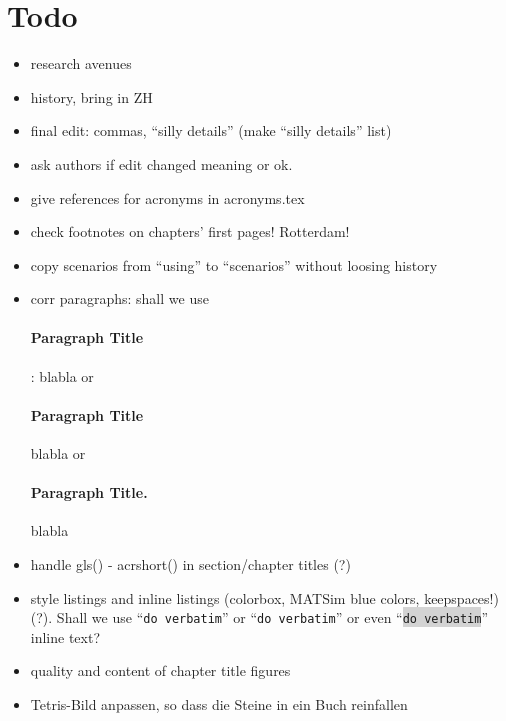 \section*{Todo}

\begin{itemize}\styleItemize

\item research avenues

\item history, bring in ZH

\item final edit: commas, ``silly details'' (make ``silly details'' list)

\item ask authors if edit changed meaning or ok.

\item give references for acronyms in acronyms.tex

\item check footnotes on chapters' first pages! Rotterdam!

\item copy scenarios from ``using'' to ``scenarios'' without loosing history

\item corr paragraphs: shall we use \paragraph{Paragraph Title}: blabla or \paragraph{Paragraph Title} blabla or \paragraph{Paragraph Title.} blabla

\item handle gls() - acrshort() in section/chapter titles (?)

\item style listings and inline listings (colorbox, MATSim blue colors, keepspaces!) (?). Shall we use ``\verb|do verbatim|'' or ``\lstinline|do verbatim|'' or even ``\colorbox{lightgray}{\lstinline|do verbatim|}'' inline text?

\item quality and content of chapter title figures

\item Tetris-Bild anpassen, so dass die Steine in ein Buch reinfallen


\end{itemize}
